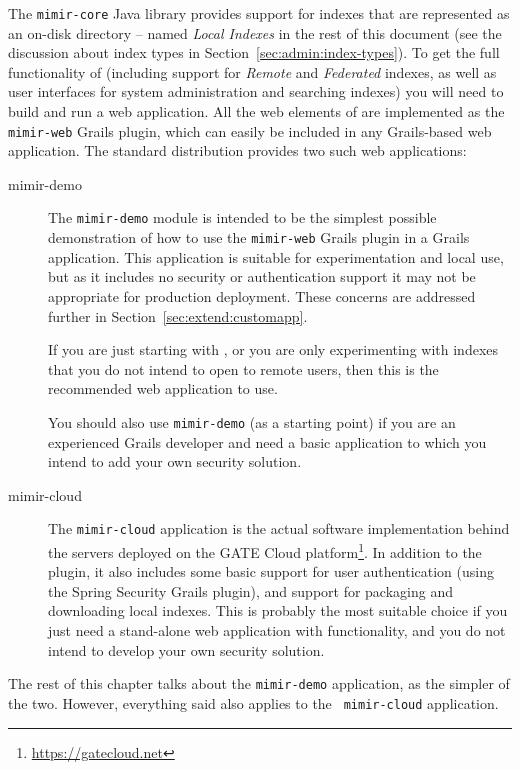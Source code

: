 The {\tt mimir-core} Java library provides support for indexes that are
represented as an on-disk directory -- named {\em Local Indexes} in the rest of
this document (see the discussion about index types in
Section~\ref{sec:admin:index-types}). To get the full functionality of \Mimir{}
(including support for {\em Remote} and {\em Federated} indexes, as well as user
interfaces for system administration and searching indexes) you will need to
build and run a web application. All the web elements of \Mimir{} are
implemented as the {\tt mimir-web} Grails plugin, which can easily be included
in any Grails-based web application. The standard \Mimir{} distribution provides
two such web applications:
\begin{description}
\item[mimir-demo] The {\tt mimir-demo} module is intended to be the simplest
  possible  demonstration of how to use the {\tt mimir-web} Grails plugin in a
  Grails application. This application is suitable for experimentation and
  local use, but as it includes no security or authentication support it may not
  be appropriate for production deployment. These concerns are addressed further
  in Section~\ref{sec:extend:customapp}.
  
  If you are just starting with \Mimir{}, or you are only experimenting with
  \Mimir{} indexes that you do not intend to open to remote users, then this is
  the recommended web application to use.
  
  You should also use {\tt mimir-demo} (as a starting point) if you are an
  experienced Grails developer and need a basic application to which you intend
  to add your own security solution.
\item[mimir-cloud] The {\tt mimir-cloud} application is the actual software
  implementation behind the {\Mimir} servers deployed on the GATE Cloud
  platform\footnote{\url{https://gatecloud.net}}. In addition to the \Mimir{}
  plugin, it also includes some basic support for user authentication (using
  the Spring Security Grails plugin), and support for packaging and downloading
  local indexes. This is probably the most suitable choice if you just need a
  stand-alone web application with \Mimir{} functionality, and you do not intend
  to develop your own security solution.
\end{description}

The rest of this chapter talks about the {\tt mimir-demo} application, as the
simpler of the two. However, everything said also applies to the {\tt
mimir-cloud} application.



